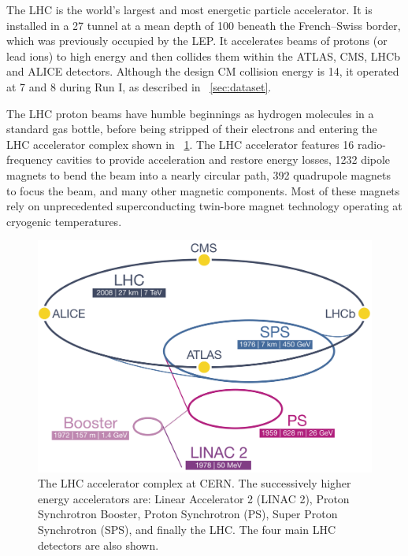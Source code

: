 
The \ac{LHC} is the world's largest and most energetic particle accelerator. It is 
installed in a \unit{27}{\kilo\metre} tunnel at a mean depth of \unit{100}{\metre} beneath 
the French--Swiss border, which was previously occupied by the \ac{LEP}. It accelerates 
beams of protons (or lead ions) to high energy and then collides them within the
ATLAS, CMS, LHCb and ALICE detectors. Although the design \ac{CM} collision energy is 
\unit{14}{\TeV}, it operated at \unit{7}{\TeV} and \unit{8}{\TeV} during Run I, as 
described in \Section~\ref{sec:dataset}.

The \ac{LHC} proton beams have humble beginnings as hydrogen molecules in a standard gas 
bottle, before being stripped of their electrons and entering the \ac{LHC} accelerator 
complex shown in \Figure~\ref{fig:lhc}. The \ac{LHC} accelerator features 16 
radio-frequency cavities to provide acceleration and restore energy losses, 1232 
dipole magnets to bend the beam into a nearly circular path, 392 quadrupole magnets to 
focus the beam, and many other magnetic components. Most of these magnets rely on 
unprecedented superconducting twin-bore magnet technology operating at cryogenic 
temperatures.

\begin{figure}
	\includegraphics[width=\largefigwidth]{tex/experiment/lhc}
	\caption{The \ac{LHC} accelerator complex at CERN. The successively higher energy 
	accelerators are: Linear Accelerator 2 (LINAC 2), Proton Synchrotron Booster, Proton 
	Synchrotron (PS), Super Proton Synchrotron (SPS), and finally the \acf{LHC}. The four 
	main \ac{LHC} detectors are also shown.}
	\label{fig:lhc}
\end{figure}

